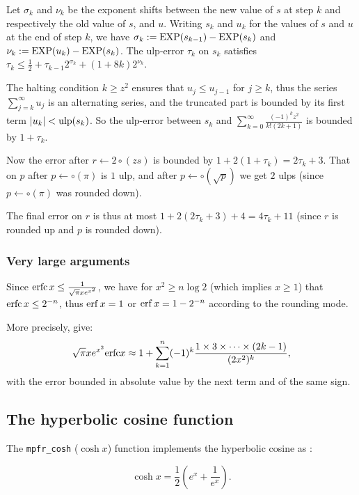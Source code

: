 \documentclass[12pt]{amsart}
\begin{document}
Let $\sigma_k$ and $\nu_k$ be the exponent shifts between the new value of
$s$ at step $k$ and respectively the old value of $s$, and $u$.
Writing $s_k$ and $u_k$ for the values of $s$ and $u$ at the end of step $k$,
we have $\sigma_k := {\rm EXP}(s_{k-1}) - {\rm EXP}(s_k)$
and $\nu_k := {\rm EXP}(u_k) - {\rm EXP}(s_k)$.
The ulp-error $\tau_k$ on $s_k$ satisfies
$\tau_k \leq \frac{1}{2} + \tau_{k-1} 2^{\sigma_k} + (1+8k) 2^{\nu_k}$.

The halting condition $k \geq z^2$ ensures that $u_j \leq u_{j-1}$ for
$j \geq k$, thus the series $\sum_{j=k}^{\infty} u_j$ is an alternating series,
and the truncated part is bounded by its first term $|u_k| < {\rm ulp}(s_k)$.
So the ulp-error between $s_k$ and $\sum_{k=0}^{\infty} \frac{(-1)^k z^2}{k!
(2k+1)}$ is bounded by $1+\tau_k$.

Now the error after $r \leftarrow 2 \circ (z s)$ is bounded by
$1 + 2 (1+\tau_k) = 2 \tau_k + 3$.
That on $p$ after $p \leftarrow \circ (\pi)$ is $1$ ulp,
and after $p \leftarrow \circ (\sqrt{p})$ we get $2$ ulps
(since $p \leftarrow \circ (\pi)$ was rounded down).

The final error on $r$ is thus at most
$1 + 2 (2 \tau_k + 3) + 4 = 4 \tau_k + 11$
(since $r$ is rounded up and $p$ is rounded down).

\subsubsection{Very large arguments}

Since ${\rm erfc} \, x \leq \frac{1}{\sqrt{\pi} x e^{x^2}}$,
we have for $x^2 \geq n \log 2$ (which implies $x \geq 1$)
that ${\rm erfc} \, x \leq 2^{-n}$, thus
${\rm erf} \, x = 1$ or ${\rm erf} \, x = 1 - 2^{-n}$ according to the
rounding mode.

More precisely, \cite[formul{\ae} 7.1.23 and 7.1.24]{AbSt73} give:
\[ \sqrt{\pi} x e^{x^2} {\rm erfc} x \approx
   1 + \sum_{k=1}^n (-1)^k \frac{1 \times 3 \times \cdots \times (2k-1)}
   {(2x^2)^k}, \]
with the error bounded in absolute value by the next term and of the same sign.

\subsection{The hyperbolic cosine function}

The {\tt mpfr\_cosh} ($\cosh{x}$) function implements the hyperbolic
cosine as :

\[\cosh x = \frac{1}{2} \left( e^{x} + \frac{1}{e^x} \right).\]
\end{document}
